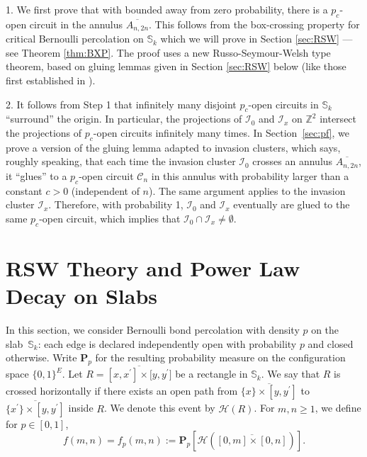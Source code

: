 \documentclass[12pt, twoside,a4paper,reqno]{amsart}
\theoremstyle{plain}
\theoremstyle{remark}
\theoremstyle{definition}
\newcommand{\ol}{\overline}
\renewcommand{\bar}{\overline}
\begin{document}
1. We first prove that with bounded away from zero probability, there is a
$p_{c}$-open circuit in the annulus $\ol{A_{n,2n}}$. This follows from the
box-crossing property for critical Bernoulli percolation on $\mathbb{S}_{k}$
which we will prove in Section \ref{sec:RSW} --- see Theorem \ref{thm:BXP}. The
proof uses a new Russo-Seymour-Welsh type theorem, based on gluing lemmas given
in Section \ref{sec:RSW} below (like those first established in \cite{DST}).

2. It follows from Step 1 that infinitely many disjoint $p_{c}$-open circuits in
$\mathbb{S}_{k}$ ``surround'' the origin. In particular, the projections of
$\mathcal{I}_{0}$ and $\mathcal{I}_{x}$ on $\mathbb{Z}^{2}$ intersect the
projections of $p_{c}$-open circuits infinitely many times. In
Section~\ref{sec:pf}, we prove a version of the gluing lemma adapted to invasion
clusters, which says, roughly speaking, that each time the invasion cluster
$\mathcal{I}_{0}$ crosses an annulus $\ol{A_{n,2n}}$, it ``glues'' to a
$p_c$-open circuit $\mathcal C_n$ in this annulus with probability larger than a
constant $c>0$ (independent of $n$). The same argument applies to the invasion
cluster $\mathcal{I}_{x}$. Therefore, with probability 1, $\mathcal{I}_{0}$ and
$\mathcal{I}_x$ eventually are glued to the same $p_c$-open circuit, which
implies that $\mathcal{I}_{0}\cap \mathcal{I}_{x}\neq \emptyset$.



\section{RSW Theory and Power Law Decay on Slabs\label{sec:RSW}}

In this section, we consider Bernoulli bond percolation with density $p$ on the
slab~$\mathbb{S}_{k}$: each edge is declared independently open with probability
$p$ and closed otherwise. Write $\mathbf P_p$ for the resulting probability
measure on the configuration space $\{0,1\}^{E}$. Let $R=\ol{[x,x^{\prime }]\times
\lbrack y,y^{\prime }]}$ be a rectangle in $\mathbb S_k$. We say that $%
R$ is crossed horizontally if there exists an open path from $\ol{\{x\}\times
[y,y^{\prime }]}$ to $\ol{\{x^{\prime }\}\times [y,y^{\prime }]}$ inside $R$. We denote this
event by $\mathcal{H}(R)$. For $m,n\geq 1$, we define for $p \in [0,1]$,
\begin{equation}
f(m,n)=f_p(m,n):=\mathbf{P}_{p}\left[ \mathcal{H}\left (\ol{[0,m]\times[0,n]}\right)\right].
\end{equation}
\end{document}
